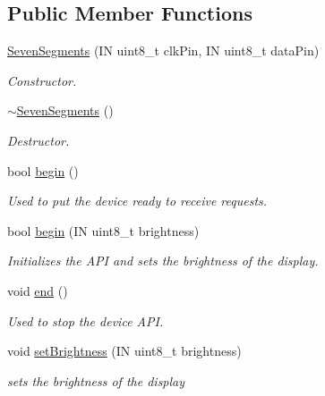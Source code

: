 \subsection*{Public Member Functions}
\begin{DoxyCompactItemize}
\item 
\hyperlink{class_easyuino_1_1_seven_segments_ae211f73df6a9f111c8cf9daec9080a12}{Seven\+Segments} (IN uint8\+\_\+t clk\+Pin, IN uint8\+\_\+t data\+Pin)
\begin{DoxyCompactList}\small\item\em Constructor. \end{DoxyCompactList}\item 
\mbox{\label{class_easyuino_1_1_seven_segments_af479d106b55f0a9541193ab1d0e79a16}} 
\hyperlink{class_easyuino_1_1_seven_segments_af479d106b55f0a9541193ab1d0e79a16}{$\sim$\+Seven\+Segments} ()
\begin{DoxyCompactList}\small\item\em Destructor. \end{DoxyCompactList}\item 
bool \hyperlink{class_easyuino_1_1_seven_segments_ab59d5cbdc22567fb97854f32d899e02d}{begin} ()
\begin{DoxyCompactList}\small\item\em Used to put the device ready to receive requests. \end{DoxyCompactList}\item 
bool \hyperlink{class_easyuino_1_1_seven_segments_a5bca3d50fdabd6d6376df20d4c561f0d}{begin} (IN uint8\+\_\+t brightness)
\begin{DoxyCompactList}\small\item\em Initializes the A\+PI and sets the brightness of the display. \end{DoxyCompactList}\item 
void \hyperlink{class_easyuino_1_1_seven_segments_afea49385382a7b9c597b4fe42a003fee}{end} ()
\begin{DoxyCompactList}\small\item\em Used to stop the device A\+PI. \end{DoxyCompactList}\item 
void \hyperlink{class_easyuino_1_1_seven_segments_acda60844df104bb1580a3a3475ce402d}{set\+Brightness} (IN uint8\+\_\+t brightness)
\begin{DoxyCompactList}\small\item\em sets the brightness of the display \end{DoxyCompactList}\item 

\end{DoxyCompactItemize}

